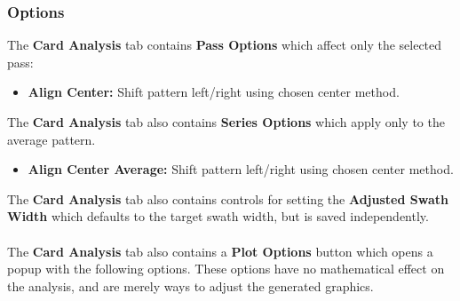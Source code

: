 \documentclass[10pt,letterpaper,titlepage]{article}
\begin{document}
    \subsubsection{Options}
    The \textbf{Card Analysis} tab contains \textbf{Pass Options} which affect only the selected pass:
    \begin{itemize}
        \item \textbf{Align Center:} Shift pattern left/right using chosen center method.
    \end{itemize}
    The \textbf{Card Analysis} tab also contains \textbf{Series Options} which apply only to the average pattern.
    \begin{itemize}
        \item \textbf{Align Center Average:} Shift pattern left/right using chosen center method.
    \end{itemize}
    The \textbf{Card Analysis} tab also contains controls for setting the \textbf{Adjusted Swath Width} which defaults to the target swath width, but is saved independently.\\\\
    The \textbf{Card Analysis} tab also contains a \textbf{Plot Options} button which opens a popup with the following options. These options have no mathematical effect on the analysis, and are merely ways to adjust the generated graphics.
\end{document}
